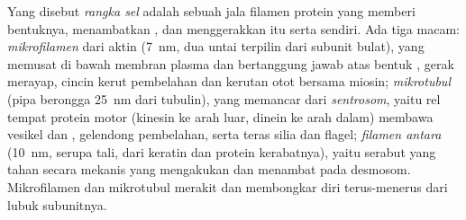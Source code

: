 \begin{definition}\label{def:b1:eukaryotic-cell:cytoskeleton}
Yang disebut \emph{rangka sel} adalah sebuah jala
filamen protein yang memberi  bentuknya, menambatkan , dan
menggerakkan  itu serta  sendiri. Ada tiga macam:
\emph{mikrofilamen} dari aktin (\qty{7}{nm}, dua
untai terpilin dari subunit bulat), yang memusat di bawah membran
plasma dan bertanggung jawab atas bentuk , gerak merayap, cincin
kerut pembelahan dan kerutan otot bersama miosin;
\emph{mikrotubul} (pipa berongga \qty{25}{nm} dari
tubulin), yang memancar dari \emph{sentrosom}, yaitu
rel tempat protein motor (kinesin ke arah luar, dinein ke arah dalam)
membawa vesikel dan , gelendong pembelahan, serta teras silia
dan flagel; \emph{filamen antara} (\qty{10}{nm},
serupa tali, dari keratin dan protein kerabatnya), yaitu serabut yang
tahan secara mekanis yang mengakukan  dan menambat pada desmosom.
Mikrofilamen dan mikrotubul merakit dan membongkar diri terus-menerus
dari lubuk subunitnya.
\end{definition}

